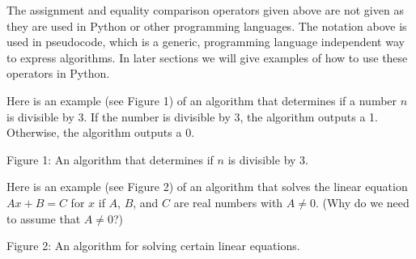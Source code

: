 \documentclass{ximera}
\begin{document}
The assignment and equality comparison operators given above are not given as they are used in Python or other programming languages. The notation above is used in pseudocode, which is a generic, programming language independent way to express algorithms. In later sections we will give examples of how to use these operators in Python.

Here is an example (see Figure 1) of an algorithm that determines if a number $n$ is divisible by 3. If the number is divisible by 3, the algorithm outputs a 1. Otherwise, the algorithm outputs a 0.

\begin{center}
\end{center}
\begin{center}
	Figure 1: An algorithm that determines if $n$ is divisible by 3.
\end{center}

Here is an example (see Figure 2) of an algorithm that solves the linear equation $Ax+B=C$ for $x$ if $A$, $B$, and $C$ are real numbers with $A\neq 0$. (Why do we need to assume that $A\neq 0$?)

\begin{center}
\end{center}
\begin{center}
	Figure 2: An algorithm for solving certain linear equations.
\end{center}
\end{document}
